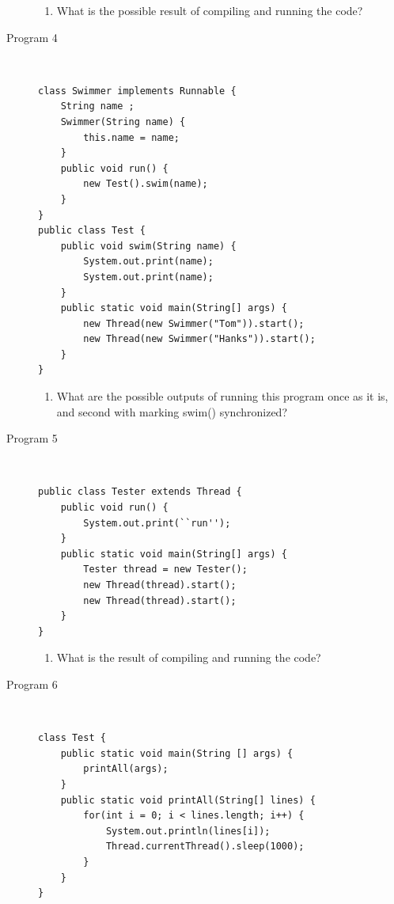 \documentclass[11pt,a4paper]{article}
\def\AnswerBox{\fbox{\begin{minipage}{4in}\hfill\vspace{0.5in}\end{minipage}}}
\begin{document}
\begin{description}
\AnswerBox

\begin{enumerate}[label=\bfseries Q\arabic*:]\itemsep10pt
\item What is the possible result of compiling and running the code?
\end{enumerate}

\item [Program 4] \
\begin{lstlisting}
class Swimmer implements Runnable {
    String name ;
    Swimmer(String name) {
        this.name = name;
    } 
    public void run() {
        new Test().swim(name);
    }
}
public class Test {
    public void swim(String name) {
        System.out.print(name);
        System.out.print(name);
    }
    public static void main(String[] args) {
        new Thread(new Swimmer("Tom")).start();
        new Thread(new Swimmer("Hanks")).start();
    }
}
\end{lstlisting}

\AnswerBox

\begin{enumerate}[label=\bfseries Q\arabic*:]\itemsep10pt
\item What are the possible outputs of running this program once as it is, and second with marking swim() synchronized?
    \end{enumerate}

\item [Program 5] \
\begin{lstlisting}
public class Tester extends Thread {
    public void run() {
        System.out.print(``run'');
    }
    public static void main(String[] args) {
        Tester thread = new Tester();
        new Thread(thread).start();
        new Thread(thread).start();
    }
}
\end{lstlisting}

\AnswerBox

\begin{enumerate}[label=\bfseries Q\arabic*:]\itemsep10pt
\item What is the result of compiling and running the code?
\end{enumerate}

\item [Program 6] \
\begin{lstlisting}
class Test {
    public static void main(String [] args) {
        printAll(args);
    }
    public static void printAll(String[] lines) {
        for(int i = 0; i < lines.length; i++) {
            System.out.println(lines[i]);
            Thread.currentThread().sleep(1000);
        }
    }
}
\end{lstlisting}


\end{description}
\end{document}
